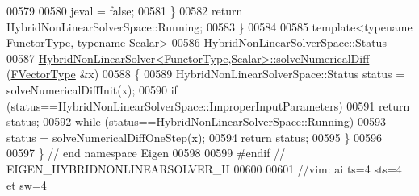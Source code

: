 \begin{DoxyCode}
00579 
00580         jeval = \textcolor{keyword}{false};
00581     \}
00582     \textcolor{keywordflow}{return} HybridNonLinearSolverSpace::Running;
00583 \}
00584 
00585 \textcolor{keyword}{template}<\textcolor{keyword}{typename} FunctorType, \textcolor{keyword}{typename} Scalar>
00586 HybridNonLinearSolverSpace::Status
00587 \hyperlink{class_eigen_1_1_hybrid_non_linear_solver}{HybridNonLinearSolver<FunctorType,Scalar>::solveNumericalDiff}
      (\hyperlink{group___core___module}{FVectorType}  &x)
00588 \{
00589     HybridNonLinearSolverSpace::Status status = solveNumericalDiffInit(x);
00590     \textcolor{keywordflow}{if} (status==HybridNonLinearSolverSpace::ImproperInputParameters)
00591         \textcolor{keywordflow}{return} status;
00592     \textcolor{keywordflow}{while} (status==HybridNonLinearSolverSpace::Running)
00593         status = solveNumericalDiffOneStep(x);
00594     \textcolor{keywordflow}{return} status;
00595 \}
00596 
00597 \} \textcolor{comment}{// end namespace Eigen}
00598 
00599 \textcolor{preprocessor}{#endif // EIGEN\_HYBRIDNONLINEARSOLVER\_H}
00600 
00601 \textcolor{comment}{//vim: ai ts=4 sts=4 et sw=4}
\end{DoxyCode}
